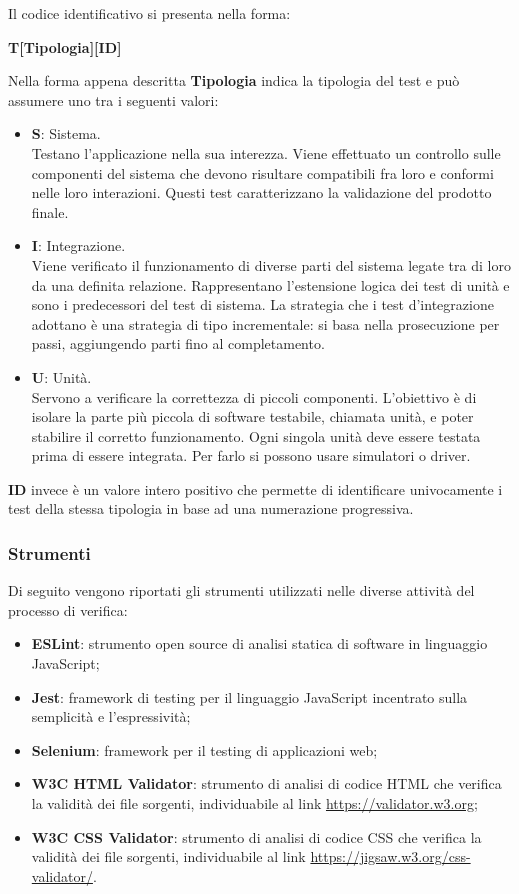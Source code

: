 Il codice identificativo si presenta nella forma:
\begin{center}
    \textbf{T[Tipologia][ID]}
\end{center}
Nella forma appena descritta \textbf{Tipologia} indica la tipologia del test e può assumere uno tra i seguenti valori:
\begin{itemize}
	\item \textbf{S}: Sistema. \\ Testano l’applicazione nella sua interezza. Viene effettuato un controllo sulle componenti del sistema che devono risultare compatibili fra loro e conformi nelle loro interazioni. 
    Questi test caratterizzano la validazione del prodotto finale.     
	\item \textbf{I}: Integrazione. \\ Viene verificato il funzionamento di diverse parti del sistema legate tra di loro da una definita relazione. 
    Rappresentano l’estensione logica dei test di unità e sono i predecessori del test di sistema. La strategia che i test d’integrazione adottano è una strategia di tipo incrementale: si basa nella prosecuzione per passi, aggiungendo parti fino al completamento.     
	\item \textbf{U}: Unità. \\ Servono a verificare la correttezza di piccoli componenti. L’obiettivo è di isolare la parte più piccola di software testabile, chiamata unità, e poter stabilire il corretto funzionamento. 
    Ogni singola unità deve essere testata prima di essere integrata. Per farlo si possono usare simulatori o driver.

\end{itemize}

\textbf{ID} invece è un valore intero positivo che permette di identificare univocamente i test della stessa tipologia in base ad una
numerazione progressiva.

\subsubsection{Strumenti}
\label{ssub:verifica:strumenti}

Di seguito vengono riportati gli strumenti utilizzati nelle diverse attività del processo di verifica:
\begin{itemize}
	\item \textbf{ESLint}: strumento open source di analisi statica di software in linguaggio JavaScript;
	\item \textbf{Jest}: framework di testing per il linguaggio JavaScript incentrato sulla semplicità e l'espressività;
	\item \textbf{Selenium}: framework per il testing di applicazioni web;
	\item \textbf{W3C HTML Validator}: strumento di analisi di codice HTML che verifica la validità dei file sorgenti, individuabile al
		link \url{https://validator.w3.org};
	\item \textbf{W3C CSS Validator}: strumento di analisi di codice CSS che verifica la validità dei file sorgenti, individuabile al
		link \url{https://jigsaw.w3.org/css-validator/}.
\end{itemize}

